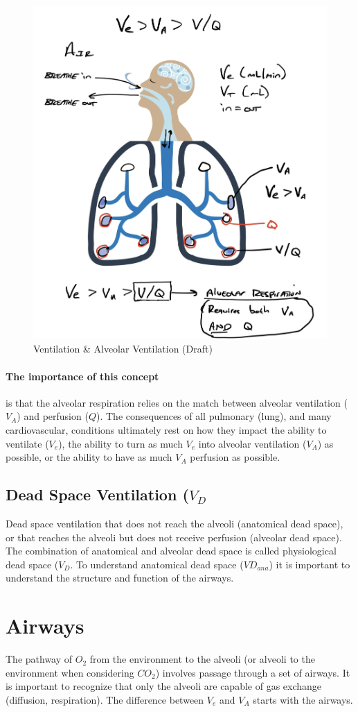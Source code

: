 \begin{figure}
    \centering
    \includegraphics[width = 0.5\linewidth]{./figure/ventilation/ve_va.jpg}
    \caption{Ventilation \& Alveolar Ventilation (Draft)}
    \label{fig:ve_va.jpg}
\end{figure}

\paragraph{The importance of this concept} is that the alveolar respiration relies on the match between alveolar ventilation ($V_A$) and perfusion ($Q$). The consequences of all pulmonary (lung), and many cardiovascular, conditions ultimately rest on how they impact the ability to ventilate ($V_e$), the ability to turn as much $V_e$ into alveolar ventilation ($V_A$) as possible, or the ability to have as much $V_A$ perfusion as possible.

\subsection{Dead Space Ventilation ($V_D$}
Dead space ventilation that does not reach the alveoli (anatomical dead space), or that reaches the alveoli but does not receive perfusion (alveolar dead space). The combination of anatomical and alveolar dead space is called physiological dead space ($V_D$. To understand anatomical dead space ($VD_{ana}$) it is important to understand the structure and function of the airways.

\section{Airways}

The pathway of $O_2$ from the environment to the alveoli (or alveoli to the environment when considering $CO_2$) involves passage through a set of airways. It is important to recognize that only the alveoli are capable of gas exchange (diffusion, respiration). The difference between $V_e$ and $V_A$ starts with the airways.  

